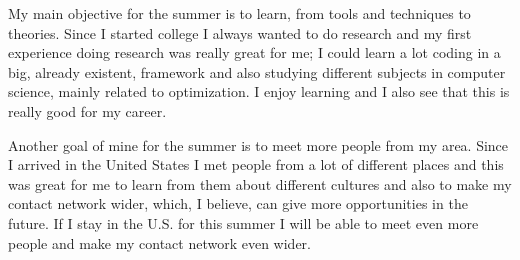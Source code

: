 \documentclass[11pt, a4paper]{awesome-cv}
\begin{document}
\begin{cvletter}
\par My main objective for the summer is to learn, from tools and techniques to theories. Since I started college I always wanted to do research and my first experience doing research was really great for me; I could learn a lot coding in a big, already existent, framework and also studying different subjects in computer science, mainly related to optimization. I enjoy learning and I also see that this is really good for my career. 
\par Another goal of mine for the summer is to meet more people from my area. Since I arrived in the United States I met people from a lot of different places and this was great for me to learn from them about different cultures and also to make my contact network wider, which, I believe, can give more opportunities in the future. If I stay in the U.S. for this summer I will be able to meet even more people and make my contact network even wider.

\end{cvletter}


\end{document}
